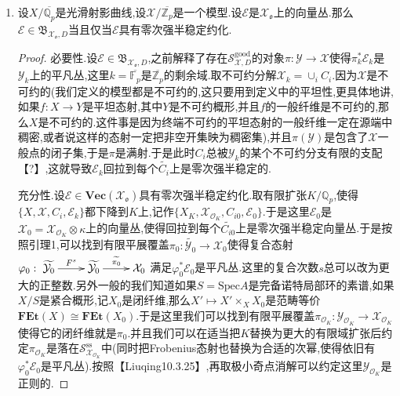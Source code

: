 \begin{enumerate}
\begin{proof}
    	归结为仿射情况.记$T=\mathrm{Spec}R$,记$S=\mathrm{Spec}R/\mathfrak{a}$,其中$\mathfrak{a}$是根理想.那么$S'$对应的环就是$R/\mathfrak{a}\otimes_{R,p^N}R\cong R/\mathfrak{b}$,其中$\mathfrak{b}$是由$\{r^{p^N}\mid r\in\mathfrak{a}\}$生成的理想.于是$i$对应的环同态就是$R/\mathfrak{b}\to R/\mathfrak{a}$.但是明显有$\sqrt{\mathfrak{b}}=\mathfrak{a}$,结合$\mathfrak{a}$是根理想得证.
    \end{proof}
    \item 设$X/\overline{\mathbb{Q}_p}$是光滑射影曲线,设$\mathcal{X}/\overline{\mathbb{Z}_p}$是一个模型.设$\mathcal{E}$是$\mathcal{X}_{\mathfrak{o}}$上的向量丛.那么$\mathcal{E}\in\mathfrak{B}_{\mathcal{X}_{\mathfrak{o}},D}$当且仅当$\mathcal{E}$具有零次强半稳定约化.
    \begin{proof}
    	
    	必要性.设$\mathcal{E}\in\mathfrak{B}_{\mathcal{X}_{\mathfrak{o}},D}$,之前解释了存在$\mathcal{S}_{\mathcal{X},D}^{\mathrm{good}}$的对象$\pi:\mathcal{Y}\to\mathcal{X}$使得$\pi_k^*\mathcal{E}_k$是$\mathcal{Y}_k$上的平凡丛,这里$k=\overline{\mathbb{F}_p}$是$\overline{\mathbb{Z}_p}$的剩余域.取不可约分解$\mathcal{X}_k=\cup_iC_i$.因为$\mathcal{X}$是不可约的(我们定义的模型都是不可约的,这只要用到定义中的平坦性,更具体地讲,如果$f:X\to Y$是平坦态射,其中$Y$是不可约概形,并且$f$的一般纤维是不可约的,那么$X$是不可约的.这件事是因为终端不可约的平坦态射的一般纤维一定在源端中稠密,或者说这样的态射一定把非空开集映为稠密集),并且$\pi(\mathcal{Y})$是包含了$\mathcal{X}$一般点的闭子集,于是$\pi$是满射.于是此时$C_i$总被$\mathcal{Y}_k$的某个不可约分支有限的支配【?】,这就导致$\mathcal{E}_k$回拉到每个$\widetilde{C_i}$上是零次强半稳定的.
    	
    	\qquad
    	
    	充分性.设$\mathcal{E}\in\textbf{Vec}(\mathcal{X}_{\mathfrak{o}})$具有零次强半稳定约化.取有限扩张$K/\mathbb{Q}_p$,使得$\{X,\mathcal{X},C_i,\mathcal{E}_k\}$都下降到$K$上,记作$\{X_K,\mathcal{X}_{\mathscr{O}_K},C_{i0},\mathcal{E}_0\}$.于是这里$\mathcal{E}_0$是$\mathcal{X}_0=\mathcal{X}_{\mathscr{O}_K}\otimes\kappa$上的向量丛,使得回拉到每个$\widetilde{C_{i0}}$上是零次强半稳定向量丛.于是按照引理1,可以找到有限平展覆盖$\pi_0:\widetilde{\mathcal{Y}_0}\to\mathcal{X}_0$使得复合态射$\varphi_0:\xymatrix{\widetilde{\mathcal{Y}_0}\ar[r]^{F^s}&\widetilde{\mathcal{Y}_0}\ar[r]^{\widetilde{\pi_0}}&\mathcal{X}_0}$满足$\varphi^*_0\mathcal{E}_0$是平凡丛.这里的复合次数$s$总可以改为更大的正整数.另外一般的我们知道如果$S=\mathrm{Spec}A$是完备诺特局部环的素谱,如果$X/S$是紧合概形,记$X_0$是闭纤维,那么$X'\mapsto X'\times_XX_0$是范畴等价$\textbf{FEt}(X)\cong\textbf{FEt}(X_0)$.于是这里我们可以找到有限平展覆盖$\pi_{\mathscr{O}_K}:\mathcal{Y}_{\mathscr{O}_K}\to\mathcal{X}_{\mathscr{O}_K}$使得它的闭纤维就是$\pi_0$.并且我们可以在适当把$K$替换为更大的有限域扩张后约定$\pi_{\mathscr{O}_K}$是落在$\mathcal{S}^{\mathrm{ss}}_{\mathcal{X}_{\mathscr{O}_K}}$中(同时把Frobenius态射也替换为合适的次幂,使得依旧有$\varphi_0^*\mathcal{E}_0$是平凡丛).按照【Liuqing10.3.25】,再取极小奇点消解可以约定这里$\mathcal{Y}_{\mathscr{O}_K}$是正则的.
    	

\end{proof}
\end{enumerate}
